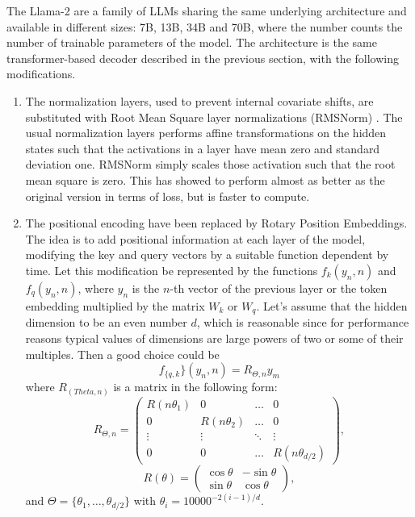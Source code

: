 \documentclass[]{marticle}
\begin{document}
The Llama-2 are a family of LLMs sharing the same underlying architecture and available in different
sizes: 7B, 13B, 34B and 70B, where the number counts the number of trainable parameters of the
model. The architecture is the same transformer-based decoder described in the previous section,
with the following modifications.
\begin{enumerate}
\item The normalization layers, used to prevent internal covariate shifts, are substituted with Root
Mean Square layer normalizations (RMSNorm) \cite{paper-rmsnorm}. The usual normalization layers
performs affine transformations on the hidden states such that the activations in a layer have mean
zero and standard deviation one. RMSNorm simply scales those activation such that the root mean
square is zero. This has showed to perform almost as better as the original version in terms of
loss, but is faster to compute.

\item The positional encoding have been replaced by Rotary Position Embeddings. The idea is to add
positional information at each layer of the model, modifying the key and query vectors by a
suitable function dependent by time. Let this modification be represented by the functions 
$f_k(y_n, n)$ and $f_q(y_n, n)$, where $y_n$ is the $n$-th vector of the previous layer or the
token embedding  multiplied by the matrix $W_k$ or $W_q$. Let's assume that the hidden dimension
to be an even number $d$, which is reasonable since for performance reasons typical values of
dimensions are large powers of two or some of their multiples. Then a good choice could be
$$ f_{\{q, k}\}(y_n, n) = R_{\Theta, n} y_m $$
where $R_(Theta, n)$ is a matrix in the following form:
$$
    R_{\Theta, n} = \begin{pmatrix} 
      R(n \theta_1)& 0& \dots& 0 \\
      0& R(n \theta_2)& \dots& 0 \\
      \vdots& \vdots& \ddots& \vdots \\
      0&0& \dots& R(n \theta_{d / 2})
    \end{pmatrix},
$$
$$
    R(\theta) = \begin{pmatrix} 
        \cos\theta & -\sin\theta \\ \sin\theta & \cos\theta
    \end{pmatrix},
$$
and $\Theta = \{ \theta_1, \dots, \theta_{d / 2} \}$ with $\theta_i = 10000^{-2(i-1) / d}$.


\end{enumerate}
\end{document}
